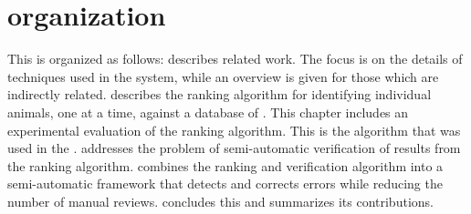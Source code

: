 

\section{\Thesis{} organization} %
    This \thesis{} is organized as follows:
     describes related work.
    The focus is on the details of techniques used in the system, while an overview is given for those which are
      indirectly related.
     describes the ranking algorithm for identifying individual animals, one \annot{} at a
      time, against a database of \exemplars{}.
    This chapter includes an experimental evaluation of the ranking algorithm.
    This is the algorithm that was used in the \GZC{}.
     addresses the problem of semi-automatic verification of results from the ranking
      algorithm.
     combines the ranking and verification algorithm into a semi-automatic framework that
      detects and corrects errors while reducing the number of manual reviews.
     concludes this \thesis{} and summarizes its contributions.
